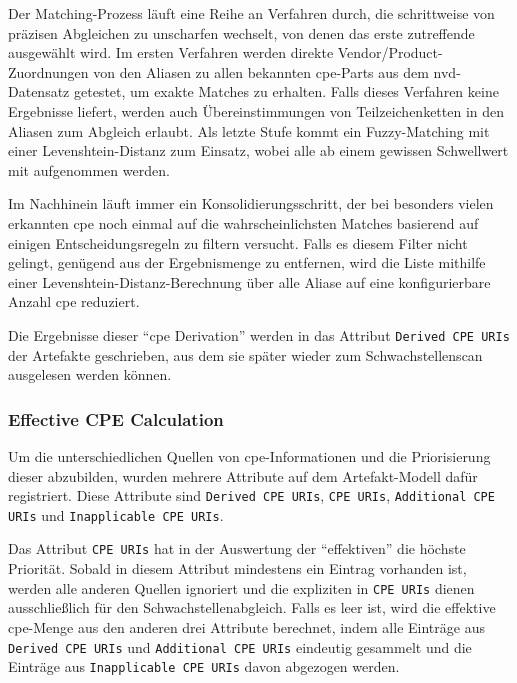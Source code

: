 Der Matching-Prozess läuft eine Reihe an Verfahren durch, die schrittweise von präzisen Abgleichen zu unscharfen wechselt, von denen das erste zutreffende ausgewählt wird.
Im ersten Verfahren werden direkte Vendor/Product-Zuordnungen von den Aliasen zu allen bekannten \acrshort{cpe}-Parts aus dem \acrshort{nvd}-Datensatz getestet, um exakte Matches zu erhalten.
Falls dieses Verfahren keine Ergebnisse liefert, werden auch Übereinstimmungen von Teilzeichenketten in den Aliasen zum Abgleich erlaubt.
Als letzte Stufe kommt ein Fuzzy-Matching mit einer Levenshtein-Distanz zum Einsatz, wobei alle  ab einem gewissen Schwellwert mit aufgenommen werden.

Im Nachhinein läuft immer ein Konsolidierungsschritt, der bei besonders vielen erkannten \acrshort{cpe} noch einmal auf die wahrscheinlichsten Matches basierend auf einigen Entscheidungsregeln zu filtern versucht.
Falls es diesem Filter nicht gelingt, genügend  aus der Ergebnismenge zu entfernen, wird die Liste mithilfe einer Levenshtein-Distanz-Berechnung über alle Aliase auf eine konfigurierbare Anzahl \acrshort{cpe} reduziert.

Die Ergebnisse dieser \enquote{\acrshort{cpe} Derivation} werden in das Attribut \texttt{Derived CPE URIs} der Artefakte geschrieben, aus dem sie später wieder zum Schwachstellenscan ausgelesen werden können.

\subsubsection{Effective CPE Calculation}\label{subsubsec:effective-cpe-calculation}

Um die unterschiedlichen Quellen von \acrshort{cpe}-Informationen und die Priorisierung dieser abzubilden, wurden mehrere Attribute auf dem Artefakt-Modell dafür registriert.
Diese Attribute sind \texttt{Derived CPE URIs}, \texttt{CPE URIs}, \texttt{Additional CPE URIs} und \texttt{Inapplicable CPE URIs}.

Das Attribut \texttt{CPE URIs} hat in der Auswertung der \enquote{effektiven}  die höchste Priorität.
Sobald in diesem Attribut mindestens ein Eintrag vorhanden ist, werden alle anderen Quellen ignoriert und die expliziten  in \texttt{CPE URIs} dienen ausschließlich für den Schwachstellenabgleich.
Falls es leer ist, wird die effektive \acrshort{cpe}-Menge aus den anderen drei Attribute berechnet, indem alle Einträge aus \texttt{Derived CPE URIs} und \texttt{Additional CPE URIs} eindeutig gesammelt und die Einträge aus \texttt{Inapplicable CPE URIs} davon abgezogen werden.

